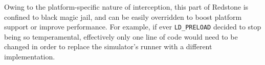 {Owing to the platform-specific nature of interception,
this part of Redstone is confined to black magic jail,
and can be easily overridden to boost platform support or improve performance.
For example,
if ever \texttt{LD\_PRELOAD} decided to stop being so temperamental,
effectively only one line of code would need to be changed in order to replace the simulator’s runner with a different implementation.

}



% 


